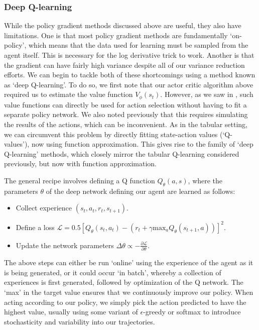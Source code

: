 

\subsubsection*{Deep Q-learning}

While the policy gradient methods discussed above are useful, they also have limitations.
One is that most policy gradient methods are fundamentally `on-policy', which means that the data used for learning must be sampled from the agent itself.
This is necessary for the log derivative trick to work.
Another is that the gradient can have fairly high variance despite all of our variance reduction efforts.
We can begin to tackle both of these shortcomings using a method known as `deep Q-learning'.
To do so, we first note that our actor critic algorithm above required us to estimate the value function $V_\phi(s_t)$.
However, as we saw in , such value functions can directly be used for action selection without having to fit a separate policy network.
We also noted previously that this requires simulating the results of the actions, which can be inconvenient.
As in the tabular setting, we can circumvent this problem by directly fitting state-action values (`Q-values'), now using function approximation.
This gives rise to the family of `deep Q-learning' methods, which closely mirror the tabular Q-learning considered previously, but now with function approximation.

The general recipe involves defining a Q function $Q_\theta(a, s)$, where the parameters $\theta$ of the deep network defining our agent are learned as follows:
\begin{itemize}
    \item Collect experience $(s_t, a_t, r_t, s_{t+1})$.
    \item Define a loss $\mathcal{L} = 0.5 [ Q_\theta(s_t, a_t) - (r_t + \gamma \text{max}_a Q_\theta(s_{t+1}, a)) ]^2 $.
    \item Update the network parameters $\Delta \theta \propto - \frac{\partial \mathcal{L}}{\partial \theta}$.
\end{itemize}
The above steps can either be run `online' using the experience of the agent as it is being generated, or it could occur `in batch', whereby a collection of experiences is first generated, followed by optimization of the Q network.
The `max' in the target value ensures that we continuously improve our policy.
When acting according to our policy, we simply pick the action predicted to have the highest value, usually using some variant of $\epsilon$-greedy or softmax to introduce stochasticity and variability into our trajectories.

